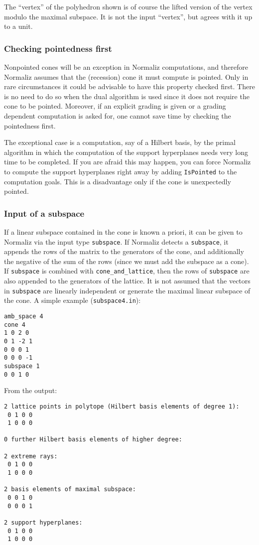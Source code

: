 \documentclass[12pt,a4paper]{scrartcl}
\theoremstyle{definition}
\begin{document}
The ``vertex'' of the polyhedron shown is of course the lifted version of the vertex modulo the maximal subspace. It is not the input ``vertex'', but agrees with it up to a unit.

\subsubsection{Checking pointedness first}\label{IsPointed}

Nonpointed cones will be an exception in Normaliz computations, and therefore Normaliz assumes that the (recession) cone it must compute is pointed. Only in rare circumstances it could be advisable to have this property checked first. There is no need to do so when the dual algorithm is used since it does not require the cone to be pointed. Moreover, if an explicit grading is given or a grading dependent computation is asked for, one cannot save time by checking the pointedness first.

The exceptional case is a computation, say of a Hilbert basis, by the primal algorithm in which the computation of the support hyperplanes needs very long time to be completed. If you are afraid this may happen, you can force Normaliz to compute the support hyperplanes right away by adding \verb|IsPointed| to the computation goals. This is a disadvantage only if the cone is unexpectedly pointed.

\subsubsection{Input of a subspace}\label{subspace}

If a linear subspace contained in the cone is known a priori, it can be given to Normaliz via the input type \verb|subspace|. If Normaliz detects a \verb|subspace|, it appends the rows of the matrix to the generators of the cone, and additionally the negative of the sum of the rows (since we must add the subspace as a cone). If \verb|subspace| is combined with \verb|cone_and_lattice|, then the rows of \verb|subspace| are also appended to the generators of the lattice. It is not assumed that the vectors in \verb|subspace| are linearly independent or generate the maximal linear subspace of the cone. A simple example (\verb|subspace4.in|):
\begin{Verbatim}
amb_space 4
cone 4
1 0 2 0
0 1 -2 1
0 0 0 1
0 0 0 -1
subspace 1
0 0 1 0
\end{Verbatim}

From the output:
\begin{Verbatim}
2 lattice points in polytope (Hilbert basis elements of degree 1):
 0 1 0 0
 1 0 0 0

0 further Hilbert basis elements of higher degree:

2 extreme rays:
 0 1 0 0
 1 0 0 0

2 basis elements of maximal subspace:
 0 0 1 0
 0 0 0 1

2 support hyperplanes:
 0 1 0 0
 1 0 0 0
\end{Verbatim}
\end{document}
